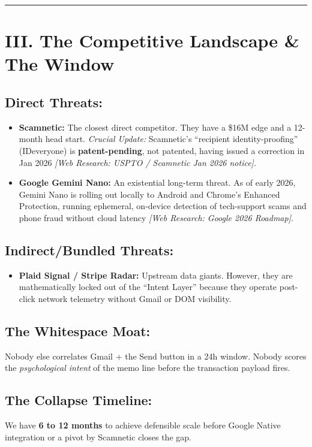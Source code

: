 \documentclass[11pt, letterpaper]{article}
\begin{document}
\vspace{12pt}
\hrule
\vspace{12pt}

\section*{III. The Competitive Landscape \& The Window}

\subsection*{Direct Threats:}
\begin{itemize}
    \item \textbf{Scamnetic:} The closest direct competitor. They have a \$16M edge and a 12-month head start. \textit{Crucial Update:} Scamnetic's ``recipient identity-proofing'' (IDeveryone) is \textbf{patent-pending}, not patented, having issued a correction in Jan 2026 \textit{[Web Research: USPTO / Scamnetic Jan 2026 notice]}.
    \item \textbf{Google Gemini Nano:} An existential long-term threat. As of early 2026, Gemini Nano is rolling out locally to Android and Chrome's Enhanced Protection, running ephemeral, on-device detection of tech-support scams and phone fraud without cloud latency \textit{[Web Research: Google 2026 Roadmap]}.
\end{itemize}

\subsection*{Indirect/Bundled Threats:}
\begin{itemize}
    \item \textbf{Plaid Signal / Stripe Radar:} Upstream data giants. However, they are mathematically locked out of the ``Intent Layer'' because they operate post-click network telemetry without Gmail or DOM visibility.
\end{itemize}

\subsection*{The Whitespace Moat:}
Nobody else correlates Gmail + the Send button in a 24h window. Nobody scores the \textit{psychological intent} of the memo line before the transaction payload fires.

\subsection*{The Collapse Timeline:}
We have \textbf{6 to 12 months} to achieve defensible scale before Google Native integration or a pivot by Scamnetic closes the gap.
\end{document}
